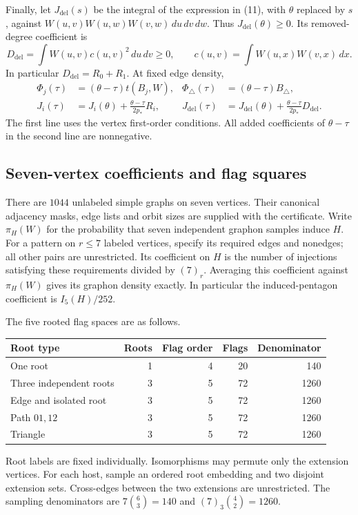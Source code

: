 \documentclass[11pt]{amsart}
\theoremstyle{definition}
\theoremstyle{remark}
\begin{document}
Finally, let \(J_{\mathrm{del}}(s)\) be the integral of the expression
in (11), with \(\theta\) replaced by \(s\), against
\(W(u,v)W(u,w)W(v,w)\,du\,dv\,dw\).
Thus \(J_{\mathrm{del}}(\theta)\ge0\). Its removed-degree coefficient is
\[
 D_{\mathrm{del}}=\int W(u,v)c(u,v)^2\,du\,dv\ge0,\qquad
 c(u,v)=\int W(u,x)W(v,x)\,dx.
\]
In particular \(D_{\mathrm{del}}=R_0+R_1\). At fixed edge density,
\begin{equation}
 \begin{aligned}
 \Phi_j(\tau)&=(\theta-\tau)t(B_j,W),
 &\Phi_\triangle(\tau)&=(\theta-\tau)B_\triangle,\\
 J_i(\tau)&=J_i(\theta)+\frac{\theta-\tau}{2p_*}R_i,
 &J_{\mathrm{del}}(\tau)&=J_{\mathrm{del}}(\theta)
                  +\frac{\theta-\tau}{2p_*}D_{\mathrm{del}}.
 \end{aligned}\tag{25}
\end{equation}
The first line uses the vertex first-order conditions. All added
coefficients of \(\theta-\tau\) in the second line are nonnegative.

\subsection{Seven-vertex coefficients and flag squares}

There are \(1044\) unlabeled simple graphs on seven vertices. Their
canonical adjacency masks, edge lists and orbit sizes are supplied with
the certificate. Write \(\pi_H(W)\) for the probability that seven
independent graphon samples induce \(H\). For a pattern on \(r\le7\)
labeled vertices, specify its required edges and nonedges; all other
pairs are unrestricted. Its coefficient on \(H\) is the number of
injections satisfying these requirements divided by \((7)_r\).
Averaging this coefficient against \(\pi_H(W)\) gives its graphon density
exactly. In particular the induced-pentagon coefficient is \(I_5(H)/252\).

The five rooted flag spaces are as follows.
\begin{center}
\begin{tabular}{lrrrr}
\toprule
Root type & Roots & Flag order & Flags & Denominator\\
\midrule
One root & 1 & 4 & 20 & 140\\
Three independent roots & 3 & 5 & 72 & 1260\\
Edge and isolated root & 3 & 5 & 72 & 1260\\
Path \(01,12\) & 3 & 5 & 72 & 1260\\
Triangle & 3 & 5 & 72 & 1260\\
\bottomrule
\end{tabular}
\end{center}
Root labels are fixed individually. Isomorphisms may permute only the
extension vertices. For each host, sample an ordered root embedding and
two disjoint extension sets. Cross-edges between the two extensions are
unrestricted. The sampling denominators are
\(7\binom63=140\) and \((7)_3\binom42=1260\).
\end{document}

